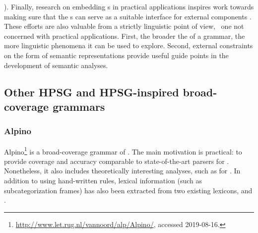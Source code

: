 \documentclass[output=paper
 	        ,biblatex
                ,babelshorthands
                ,newtxmath
                ,draftmode
                ,colorlinks, citecolor=brown
]{langscibook}
\begin{document}
\citealt[e.g.,][]{Velldal:09}). Finally, research on embedding s in
practical applications inspires work towards making sure that the s can serve as a suitable interface for external components
\citep[e.g.,][]{flickinger2005sem}.
These efforts are also valuable from a strictly linguistic point of view, \ie\ one not concerned with practical applications.  First, the broader the  of a grammar, the more linguistic phenomena it can be used to explore.  Second, external constraints on the form of semantic representations provide useful guide points in the development of semantic analyses.%
%


\subsection{Other HPSG and HPSG-inspired broad-coverage grammars}
\label{cl:othergrammars}

\subsubsection{Alpino}
\label{cl:other:alpino}

%
Alpino\footnote{%
	\url{http://www.let.rug.nl/vannoord/alp/Alpino/}, accessed 2019-08-16.
}
is a broad-coverage grammar of 
\citep{BvNM2001a-u,vannoord2005alpino,vannoord2006alpino}.
The main motivation is practical: to provide coverage and accuracy
comparable to state-of-the-art parsers for .
Nonetheless, it also includes theoretically interesting analyses,
such as for  \citep{BvN98a}.
In addition to using hand-written rules,
lexical information (such as subcategorization frames) has also been extracted from two existing lexicons,
 \citep{baayen1995celex}
and  \citep{kruyt1997parole}.
\end{document}
